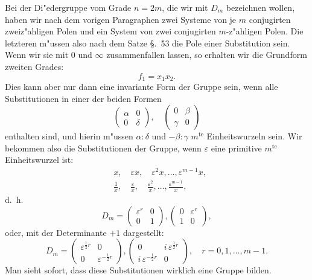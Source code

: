 \documentclass[12pt,a4paper]{article}
\theoremstyle{definition}
\begin{document}
Bei der Di"edergruppe vom Grade $n = 2m$, die wir mit $D_m$ bezeichnen wollen, haben wir nach dem vorigen Paragraphen zwei Systeme von je $m$ conjugirten zweiz"ahligen Polen und ein System von zwei conjugirten $m$-z"ahligen Polen. Die letzteren m"ussen also nach dem Satze \S.~53 die Pole einer Substitution sein. Wenn wir sie mit $0$ und $\infty$ zusammenfallen lassen, so erhalten wir die Grundform zweiten Grades:
\[
f_1 = x_1 x_2.
\]
Dies kann aber nur dann eine invariante Form der Gruppe sein, wenn alle Substitutionen in einer der beiden Formen
\[
\begin{pmatrix} \alpha & 0 \\ 0 & \delta \end{pmatrix}, \quad
\begin{pmatrix} 0 & \beta \\ \gamma & 0 \end{pmatrix}
\]
enthalten sind, und hierin m"ussen $\alpha : \delta$ und $-\beta : \gamma$ $m^{\text{te}}$ Einheitswurzeln sein. Wir bekommen also die Substitutionen der Gruppe, wenn $\varepsilon$ eine primitive $m^{\text{te}}$ Einheitswurzel ist:
\begin{align*}
&x, \quad \varepsilon x, \quad \varepsilon^2 x, \ldots, \varepsilon^{m-1} x, \\
&\frac{1}{x}, \quad \frac{\varepsilon}{x}, \quad \frac{\varepsilon^2}{x}, \ldots, \frac{\varepsilon^{m-1}}{x},
\end{align*}
d.~h.
\begin{equation}\label{eq:55-5}
D_m = \begin{pmatrix} \varepsilon^r & 0 \\ 0 & 1 \end{pmatrix}, \begin{pmatrix} 0 & \varepsilon^r \\ 1 & 0 \end{pmatrix},
\end{equation}
oder, mit der Determinante $+1$ dargestellt:
\begin{equation}\label{eq:55-6}
D_m = \begin{pmatrix} \varepsilon^{\frac{1}{2}r} & 0 \\ 0 & \varepsilon^{-\frac{1}{2}r} \end{pmatrix}, \begin{pmatrix} 0 & i\,\varepsilon^{\frac{1}{2}r} \\ i\,\varepsilon^{-\frac{1}{2}r} & 0 \end{pmatrix}, \quad r = 0, 1, \ldots, m-1.
\end{equation}
Man sieht sofort, dass diese Substitutionen wirklich eine Gruppe bilden.
\end{document}

